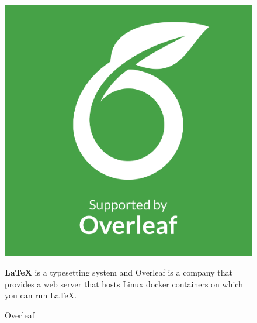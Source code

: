 \begin{figure}[h]
\centering
\begin{minipage}{0.3\textwidth}
    \centering
    \includegraphics[width=\linewidth,frame]{figures/overleaf.png}
    \caption{Overleaf}
\end{minipage}
\hfill
\begin{minipage}{0.6\textwidth}
   \textbf{LaTeX} is a typesetting system and Overleaf is a company that provides a web server that hosts Linux docker containers on which you can run LaTeX.\cite{samplewebs10}
\end{minipage}
\end{figure}

